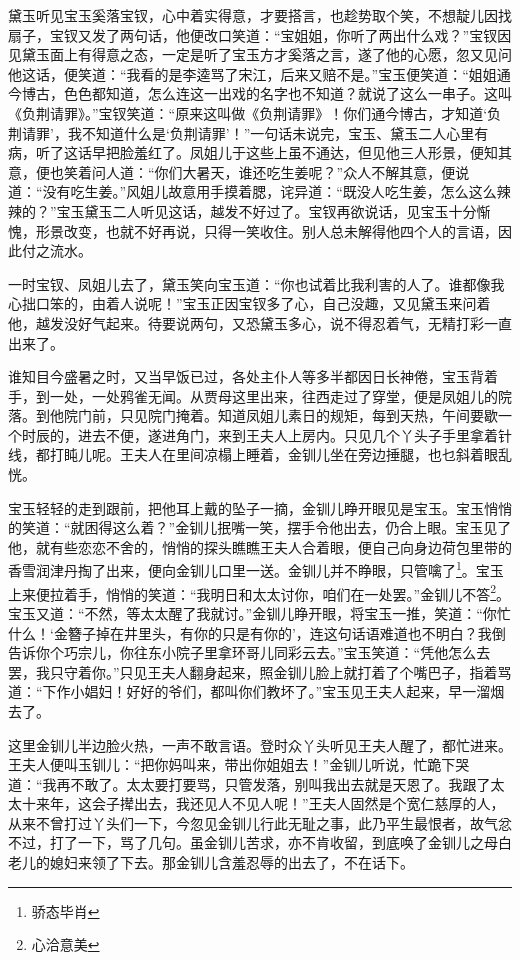 \documentclass[12pt,oneside]{book}
\begin{document}
黛玉听见宝玉奚落宝钗，心中着实得意，才要搭言，也趁势取个笑，不想靛儿因找扇子，宝钗又发了两句话，他便改口笑道：“宝姐姐，你听了两出什么戏？”宝钗因见黛玉面上有得意之态，一定是听了宝玉方才奚落之言，遂了他的心愿，忽又见问他这话，便笑道：“我看的是李逵骂了宋江，后来又赔不是。”宝玉便笑道：“姐姐通今博古，色色都知道，怎么连这一出戏的名字也不知道？就说了这么一串子。这叫《负荆请罪》。”宝钗笑道：“原来这叫做《负荆请罪》！你们通今博古，才知道‘负荆请罪’，我不知道什么是‘负荆请罪’！”一句话未说完，宝玉、黛玉二人心里有病，听了这话早把脸羞红了。凤姐儿于这些上虽不通达，但见他三人形景，便知其意，便也笑着问人道：“你们大暑天，谁还吃生姜呢？”众人不解其意，便说道：“没有吃生姜。”风姐儿故意用手摸着腮，诧异道：“既没人吃生姜，怎么这么辣辣的？”宝玉黛玉二人听见这话，越发不好过了。宝钗再欲说话，见宝玉十分惭愧，形景改变，也就不好再说，只得一笑收住。别人总未解得他四个人的言语，因此付之流水。

一时宝钗、凤姐儿去了，黛玉笑向宝玉道：“你也试着比我利害的人了。谁都像我心拙口笨的，由着人说呢！”宝玉正因宝钗多了心，自己没趣，又见黛玉来问着他，越发没好气起来。待要说两句，又恐黛玉多心，说不得忍着气，无精打彩一直出来了。

谁知目今盛暑之时，又当早饭已过，各处主仆人等多半都因日长神倦，宝玉背着手，到一处，一处鸦雀无闻。从贾母这里出来，往西走过了穿堂，便是凤姐儿的院落。到他院门前，只见院门掩着。知道凤姐儿素日的规矩，每到天热，午间要歇一个时辰的，进去不便，遂进角门，来到王夫人上房内。只见几个丫头子手里拿着针线，都打盹儿呢。王夫人在里间凉榻上睡着，金钏儿坐在旁边捶腿，也乜斜着眼乱恍。

宝玉轻轻的走到跟前，把他耳上戴的坠子一摘，金钏儿睁开眼见是宝玉。宝玉悄悄的笑道：“就困得这么着？”金钏儿抿嘴一笑，摆手令他出去，仍合上眼。宝玉见了他，就有些恋恋不舍的，悄悄的探头瞧瞧王夫人合着眼，便自己向身边荷包里带的香雪润津丹掏了出来，便向金钏儿口里一送。金钏儿并不睁眼，只管噙了\footnote{骄态毕肖}。宝玉上来便拉着手，悄悄的笑道：“我明日和太太讨你，咱们在一处罢。”金钏儿不答\footnote{心洽意美}。宝玉又道：“不然，等太太醒了我就讨。”金钏儿睁开眼，将宝玉一推，笑道：“你忙什么！‘金簪子掉在井里头，有你的只是有你的’，连这句话语难道也不明白？我倒告诉你个巧宗儿，你往东小院子里拿环哥儿同彩云去。”宝玉笑道：“凭他怎么去罢，我只守着你。”只见王夫人翻身起来，照金钏儿脸上就打着了个嘴巴子，指着骂道：“下作小娼妇！好好的爷们，都叫你们教坏了。”宝玉见王夫人起来，早一溜烟去了。

这里金钏儿半边脸火热，一声不敢言语。登时众丫头听见王夫人醒了，都忙进来。王夫人便叫玉钏儿：“把你妈叫来，带出你姐姐去！”金钏儿听说，忙跪下哭道：“我再不敢了。太太要打要骂，只管发落，别叫我出去就是天恩了。我跟了太太十来年，这会子撵出去，我还见人不见人呢！”王夫人固然是个宽仁慈厚的人，从来不曾打过丫头们一下，今忽见金钏儿行此无耻之事，此乃平生最恨者，故气忿不过，打了一下，骂了几句。虽金钏儿苦求，亦不肯收留，到底唤了金钏儿之母白老儿的媳妇来领了下去。那金钏儿含羞忍辱的出去了，不在话下。
\end{document}
